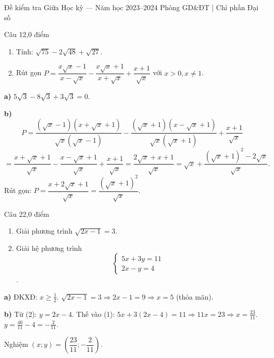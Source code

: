 ﻿%
%
  {Đề kiểm tra Giữa Học kỳ — Năm học 2023--2024}%
  {Phòng GD\&ĐT | Chỉ phần Đại số}

\begin{de_cau}{Câu 1}{2,0 điểm}
\begin{enumerate}[label=\alph*)]
\item Tính: $\sqrt{75} - 2\sqrt{48} + \sqrt{27}$.
\item Rút gọn $P = \dfrac{x\sqrt{x}-1}{x-\sqrt{x}} - \dfrac{x\sqrt{x}+1}{x+\sqrt{x}} + \dfrac{x+1}{\sqrt{x}}$
với $x>0, x\neq 1$.
\end{enumerate}
\end{de_cau}

\begin{loi_giai_cau}
\textbf{a)} $5\sqrt{3} - 8\sqrt{3} + 3\sqrt{3} = 0$.

\textbf{b)}
\[P = \frac{(\sqrt{x}-1)(x+\sqrt{x}+1)}{\sqrt{x}(\sqrt{x}-1)} - \frac{(\sqrt{x}+1)(x-\sqrt{x}+1)}{\sqrt{x}(\sqrt{x}+1)} + \frac{x+1}{\sqrt{x}}\]
\[= \frac{x+\sqrt{x}+1}{\sqrt{x}} - \frac{x-\sqrt{x}+1}{\sqrt{x}} + \frac{x+1}{\sqrt{x}} = \frac{2\sqrt{x}+x+1}{\sqrt{x}} = \sqrt{x}+\frac{(\sqrt{x}+1)^2-2\sqrt{x}}{\sqrt{x}}.\]
Rút gọn: $P = \dfrac{x+2\sqrt{x}+1}{\sqrt{x}} = \dfrac{(\sqrt{x}+1)^2}{\sqrt{x}}$.
\end{loi_giai_cau}

\begin{de_cau}{Câu 2}{2,0 điểm}
\begin{enumerate}[label=\alph*)]
\item Giải phương trình $\sqrt{2x-1} = 3$.
\item Giải hệ phương trình 
\[ \begin{cases}5x+3y=11\\2x-y=4\end{cases} \].
\end{enumerate}
\end{de_cau}

\begin{loi_giai_cau}
\textbf{a)} ĐKXĐ: $x\geq\frac{1}{2}$.
$\sqrt{2x-1}=3\Rightarrow 2x-1=9\Rightarrow x=5$ (thỏa mãn).

\textbf{b)} Từ (2): $y=2x-4$. Thế vào (1): $5x+3(2x-4)=11\Rightarrow 11x=23\Rightarrow x=\frac{23}{11}$.
$y=\frac{46}{11}-4=-\frac{2}{11}$.

Nghiệm $(x;y)=\left(\dfrac{23}{11};-\dfrac{2}{11}\right)$.
\end{loi_giai_cau}

